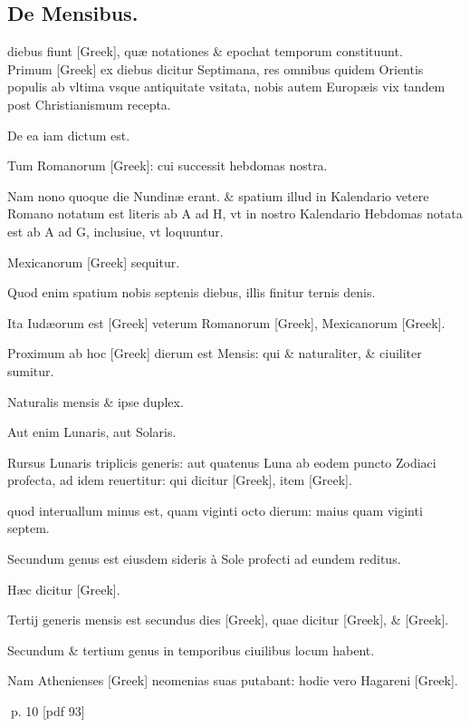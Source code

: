 \subsection{De Mensibus.}
\setcounter{parcount}{0}
\begin{parnumbers}

 diebus fiunt \textgreek{[Greek]}, quæ notationes \& epochat temporum constituunt.
\\ \p
Primum \textgreek{[Greek]} ex diebus dicitur Septimana, res omnibus quidem Orientis populis ab vltima vsque  antiquitate vsitata, nobis autem Europæis vix tandem post Christianismum recepta.

De ea iam dictum est.

Tum Romanorum \textgreek{[Greek]}: cui successit hebdomas nostra.

Nam nono quoque die Nundinæ erant. \& spatium illud in Kalendario vetere Romano notatum est literis ab A ad H, vt in nostro Kalendario Hebdomas notata est ab A ad G, inclusiue, vt loquuntur.

Mexicanorum \textgreek{[Greek]} sequitur.

Quod enim spatium nobis septenis diebus, illis finitur ternis denis.

Ita Iudæorum est \textgreek{[Greek]} veterum Romanorum \textgreek{[Greek]}, Mexicanorum \textgreek{[Greek]}.

Proximum ab hoc \textgreek{[Greek]} dierum est Mensis: qui \& naturaliter, \& ciuiliter sumitur.

Naturalis mensis \& ipse duplex.

 Aut enim Lunaris, aut Solaris.

Rursus Lunaris triplicis generis: aut quatenus Luna ab eodem puncto Zodiaci profecta, ad idem reuertitur: qui dicitur \textgreek{[Greek]}, item \textgreek{[Greek]}.

quod interuallum minus est, quam viginti octo dierum: maius quam viginti septem.

Secundum genus est eiusdem sideris à Sole profecti ad eundem reditus.

Hæc dicitur \textgreek{[Greek]}.

Tertij generis mensis est secundus dies \textgreek{[Greek]}, quae dicitur \textgreek{[Greek]}, \& \textgreek{[Greek]}.

Secundum \& tertium genus in temporibus ciuilibus locum habent.

Nam Athenienses \textgreek{[Greek]} neomenias suas putabant: hodie vero Hagareni \textgreek{[Greek]}.

\end{parnumbers}
\clearpage
p. 10 [pdf 93]


